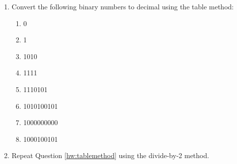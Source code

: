 \begin{multicols*}{2}
\begin{enumerate}[label=\thechapter.\arabic*]
\begin{multicols*}{2}
\begin{enumerate}
            \item 1092
            \item 1000000
        \end{enumerate}
    \end{multicols*}
    \item Convert the following binary numbers to decimal using the table method:\label{hw:tablemethod}
    \begin{enumerate}
        \item 0
        \item 1
        \item 1010
        \item 1111
        \item 1110101
        \item 1010100101
        \item 1000000000
        \item 1000100101
    \end{enumerate}
    \item Repeat Question \ref{hw:tablemethod} using the divide-by-2 method. 
   \end{enumerate} 
\end{multicols*}
